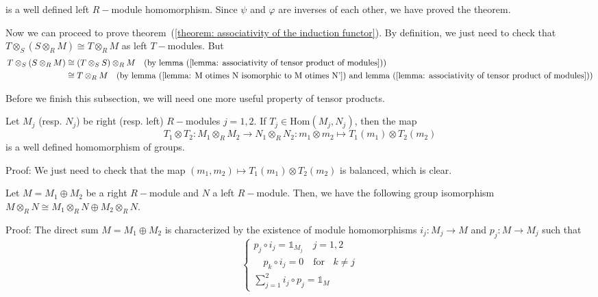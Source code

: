 is a well defined left $R-$module homomorphism. Since $\psi$ and $\varphi$ are inverses of each other, we have proved the theorem.\par
Now we can proceed to prove theorem~(\ref{theorem: associativity of the induction functor}). By definition, we just need to check that $T\otimes_S(S\otimes_RM)\cong T\otimes_RM$ as left $T-$modules. But
\begin{equation}
    \begin{split}
        T\otimes_S(S\otimes_RM)&\cong (T\otimes_SS)\otimes_RM\quad\text{(by lemma~(\ref{lemma: associativity of tensor product of modules}))}\\
        &\cong T\otimes_RM\quad\text{(by lemma~(\ref{lemma: M otimes N isomorphic to M otimes N'}) and lemma~(\ref{lemma: associativity of tensor product of modules})})
    \end{split}
\end{equation}\par
Before we finish this subsection, we will need one more useful property of tensor products.
\begin{dang}
    \begin{lemma}
        Let $M_j$ (resp. $N_j$) be right (resp. left) $R-$modules $j=1,2$. If $T_j\in \text{Hom}(M_j,N_j)$, then the map
        \begin{equation}
          T_1\otimes T_2: M_1\otimes_RM_2\rightarrow N_1\otimes_RN_2 :m_1\otimes m_2\mapsto T_1(m_1)\otimes T_2(m_2)
        \end{equation}
        is a well defined homomorphism of groups.
    \end{lemma}
\end{dang}
Proof: We just need to check that the map $(m_1,m_2)\mapsto T_1(m_1)\otimes T_2(m_2)$ is balanced, which is clear. 
\begin{dang}
    \begin{theorem}\label{theorem: tensor product distributes under coproducts}
        Let $M=M_1\oplus M_2$ be a right $R-$module and $N$ a left $R-$module. Then, we have the following group isomorphism $M\otimes_R N\cong M_1\otimes_R N\oplus M_2\otimes_R N$.
    \end{theorem}
\end{dang}
Proof: The direct sum $M=M_1\oplus M_2$ is characterized by the existence of module homomorphisms $i_j:M_j\rightarrow M$ and $p_j:M\rightarrow M_j$ such that 
\begin{equation}
    \left\{\begin{matrix}
        p_j\circ i_j=\mathds{1}_{M_j}\quad j=1,2\\
        \quad p_k\circ i_j=0\quad\text{for }\;\;k\neq j\\
        \sum_{j=1}^2i_j\circ p_j=\mathds{1}_M
    \end{matrix}\right.
\end{equation}
